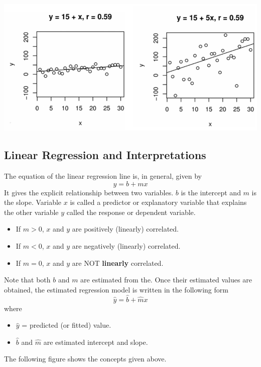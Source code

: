 \documentclass[
]{book}
\begin{document}
\hfill\break

\begin{center}\includegraphics[width=0.6\linewidth]{week12/corrVSReg} \end{center}

\hfill\break

\hypertarget{linear-regression-and-interpretations}{%
\subsection{Linear Regression and Interpretations}\label{linear-regression-and-interpretations}}

The equation of the linear regression line is, in general, given by
\[
y = b + m x
\]
It gives the explicit relationship between two variables. \(b\) is the intercept and \(m\) is the slope. Variable \(x\) is called a predictor or explanatory variable that explains the other variable \(y\) called the response or dependent variable.

\begin{itemize}
\item
  If \(m > 0\), \(x\) and \(y\) are positively (linearly) correlated.
\item
  If \(m < 0\), \(x\) and \(y\) are negatively (linearly) correlated.
\item
  If \(m = 0\), \(x\) and \(y\) are NOT \textbf{linearly} correlated.
\end{itemize}

Note that both \(b\) and \(m\) are estimated from the. Once their estimated values are obtained, the estimated regression model is written in the following form
\[
\hat{y} = \hat{b} + \hat{m} x
\]
where

\begin{itemize}
\item
  \(\hat{y}\) = predicted (or fitted) value.
\item
  \(\hat{b}\) and \(\hat{m}\) are estimated intercept and slope.
\end{itemize}

The following figure shows the concepts given above.
\end{document}
